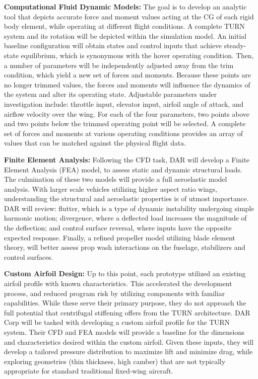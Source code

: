 \documentclass[11pt]{article}
\begin{document}
{\bf Computational Fluid Dynamic Models:}
The goal is to develop an analytic tool that depicts accurate force and moment values acting at the CG of each rigid body element, while operating at different flight conditions.  A complete TURN system and its rotation will be depicted within the simulation model.  An initial baseline configuration will obtain states and control inputs that achieve steady-state equilibrium, which is synonymous with the hover operating condition.  Then, a number of parameters will be independently adjusted away from the trim condition, which yield a new set of forces and moments.  Because these points are no longer trimmed values, the forces and moments will influence the dynamics of the system and alter its operating state.  Adjustable parameters under investigation include: throttle input, elevator input, airfoil angle of attack, and airflow velocity over the wing.  For each of the four parameters, two points above and two points below the trimmed operating point will be selected.  A complete set of forces and moments at various operating conditions provides an array of values that can be matched against the physical flight data.


{\bf Finite Element Analysis:}
Following the CFD task, DAR will develop a Finite Element Analysis (FEA) model, to assess static and dynamic structural loads.  The culmination of these two models will provide a full aeroelastic model analysis.  With larger scale vehicles utilizing higher aspect ratio wings, understanding the structural and aeroelastic properties is of utmost importance.  DAR will review: flutter, which is a type of dynamic instability undergoing simple harmonic motion; divergence, where a deflected load increases the magnitude of the deflection; and control surface reversal, where inputs have the opposite expected response.  Finally, a refined propeller model utilizing blade element theory, will better assess prop wash interactions on the fuselage, stabilizers and control surfaces.


{\bf Custom Airfoil Design:}
Up to this point, each prototype utilized an existing airfoil profile with known characteristics.  This accelerated the development process, and reduced program risk by utilizing components with familiar capabilities.  While these serve their primary purpose, they do not approach the full potential that centrifugal stiffening offers from the TURN architecture.  DAR Corp will be tasked with developing a custom airfoil profile for the TURN system.  Their CFD and FEA models will provide a baseline for the dimensions and characteristics desired within the custom airfoil.  Given these inputs, they will develop a tailored pressure distribution to maximize lift and minimize drag, while exploring geometries (thin thickness, high camber) that are not typically appropriate for standard traditional fixed-wing aircraft.
\end{document}

